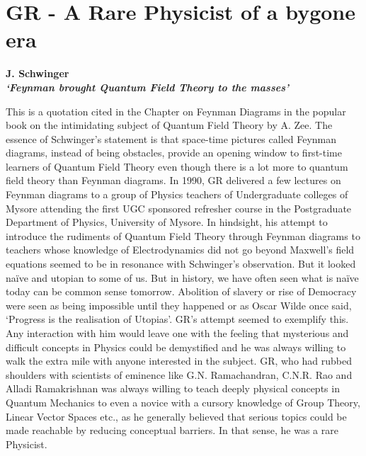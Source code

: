 \chapter{GR - A Rare Physicist of a bygone era}\label{chap8}


\begin{center}
\textbf{J. Schwinger}\\
\textbf{\textit{`Feynman brought Quantum Field Theory to the masses'}}
\end{center}

This is a quotation cited in the Chapter on Feynman Diagrams in the popular book on the intimidating subject of Quantum Field Theory by A. Zee. The essence of Schwinger's statement is that space-time pictures called Feynman diagrams, instead of being obstacles, provide an opening window to first-time learners of Quantum Field Theory even though there is a lot more to quantum field theory than Feynman diagrams. In 1990, GR delivered a few lectures on Feynman diagrams to a group of Physics teachers of Undergraduate colleges of Mysore attending the first UGC sponsored refresher course in the Postgraduate Department of Physics, University of Mysore. In hindsight, his attempt to introduce the rudiments of Quantum Field Theory through Feynman diagrams to teachers whose knowledge of Electrodynamics did not go beyond Maxwell's field equations seemed to be in resonance with Schwinger's observation. But it looked na\"{i}ve and utopian to some of us. But in history, we have often seen what is na\"{i}ve today can be common sense tomorrow. Abolition of slavery or rise of Democracy were seen as being impossible until they happened or as Oscar Wilde once said, `Progress is the realisation of Utopias'. GR's attempt seemed to exemplify this. Any interaction with him would leave one with the feeling that mysterious and difficult concepts in Physics could be demystified and he was always willing to walk the extra mile with anyone interested in the subject. GR, who had rubbed shoulders with scientists of eminence like G.N. Ramachandran, C.N.R. Rao and Alladi Ramakrishnan was always willing to teach deeply physical concepts in Quantum Mechanics to even a novice with a cursory knowledge of Group Theory,  Linear Vector Spaces etc., as he generally believed that serious topics could be made reachable by reducing conceptual barriers. In that sense, he was a rare Physicist.

